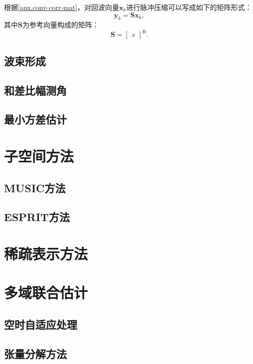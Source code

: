 根据\cref{apx.conv-corr-mat}，对回波向量\( \bm{x}_k \)进行脉冲压缩可以写成如下的矩阵形式：
\[
    \bm{y}_k = \mathbf{S} \bm{x}_k,
\]
其中\( \mathbf{S} \)为参考向量构成的矩阵：
\[
    \mathbf{S} = \begin{bmatrix}
        s
    \end{bmatrix}^{\mathrm{H}}.
\]

\subsection{波束形成}

\subsection{和差比幅测角}

\subsection{最小方差估计}

\section{子空间方法}

\subsection{MUSIC方法}

\subsection{ESPRIT方法}

\section{稀疏表示方法}

\section{多域联合估计}

\subsection{空时自适应处理}

\subsection{张量分解方法}
